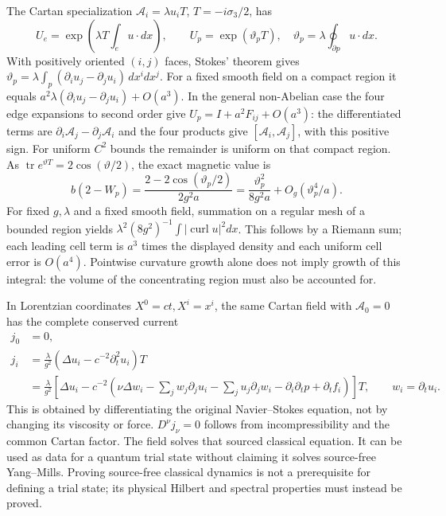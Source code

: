 \documentclass[11pt]{article}
\newcommand{\tr}{\operatorname{tr}}
\begin{document}
The Cartan specialization $\mathcal A_i=\lambda u_iT$, $T=-i\sigma_3/2$,
has
\[
 U_e=\exp\left(\lambda T\int_e u\cdot dx\right),\qquad
 U_p=\exp(\vartheta_pT),\quad
 \vartheta_p=\lambda\oint_{\partial p}u\cdot dx .
\]
With positively oriented $(i,j)$ faces, Stokes' theorem gives
$\vartheta_p=\lambda\int_p(\partial_i u_j-\partial_j u_i)\,dx^i dx^j$.
For a fixed smooth field on a compact region it equals
$a^2\lambda(\partial_i u_j-\partial_j u_i)+O(a^3)$.
In the general non-Abelian case the four edge expansions to second order
give $U_p=I+a^2F_{ij}+O(a^3)$: the differentiated terms are
$\partial_i\mathcal A_j-\partial_j\mathcal A_i$ and the four products
give $[\mathcal A_i,\mathcal A_j]$, with this positive sign.
For uniform $C^2$ bounds the remainder is uniform on that compact region.
As $\tr e^{\vartheta T}=2\cos(\vartheta/2)$, the exact magnetic value is
\begin{equation}\label{eq:fabel-magnetic-value}
 b(2-W_p)=\frac{2-2\cos(\vartheta_p/2)}{2g^2a}
       =\frac{\vartheta_p^2}{8g^2a}
          +O_g(\vartheta_p^4/a).
\end{equation}
For fixed $g,\lambda$ and a fixed smooth field, summation on a regular
mesh of a bounded region yields
$\lambda^2(8g^2)^{-1}\int|\operatorname{curl}u|^2dx$.
This follows by a Riemann sum; each leading cell term is $a^3$ times the
displayed density and each uniform cell error is $O(a^4)$.
Pointwise curvature growth alone does not imply growth of this integral:
the volume of the concentrating region must also be accounted for.

In Lorentzian coordinates $X^0=ct,X^i=x^i$, the same Cartan field with
$\mathcal A_0=0$ has the complete conserved current
\begin{align*}
 j_0&=0,\\
 j_i&=\frac{\lambda}{g^2}
       (\Delta u_i-c^{-2}\partial_t^2u_i)T\\
 &=\frac{\lambda}{g^2}\left[
 \Delta u_i-c^{-2}\left(\nu\Delta w_i
 -\sum_jw_j\partial_ju_i-\sum_ju_j\partial_jw_i
 -\partial_i\partial_tp+\partial_tf_i\right)\right]T,\qquad w_i=\partial_tu_i.
\end{align*}
This is obtained by differentiating the original Navier--Stokes equation,
not by changing its viscosity or force. $D^\nu j_\nu=0$ follows from
incompressibility and the common Cartan factor. The field solves that
sourced classical equation. It can be used as data for a quantum trial
state without claiming it solves source-free Yang--Mills. Proving
source-free classical dynamics is not a prerequisite for defining a trial
state; its physical Hilbert and spectral properties must instead be proved.
\end{document}
